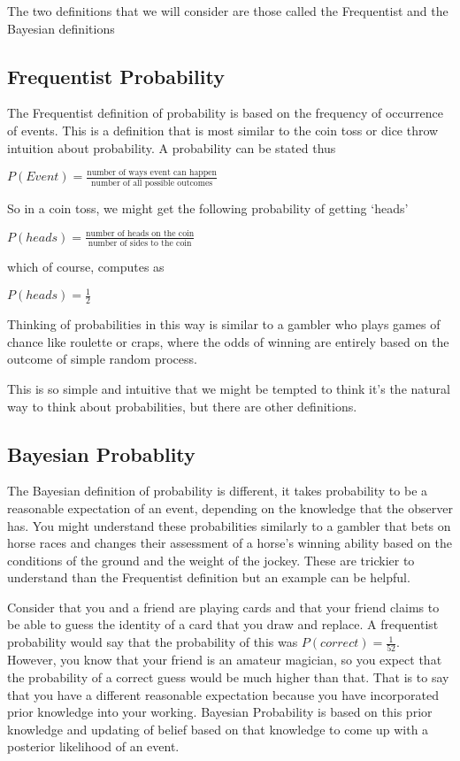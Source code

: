 \documentclass[
]{book}
\begin{document}
The two definitions that we will consider are those called the Frequentist and the Bayesian definitions

\hypertarget{frequentist-probability}{%
\subsection{Frequentist Probability}\label{frequentist-probability}}

The Frequentist definition of probability is based on the frequency of occurrence of events. This is a definition that is most similar to the coin toss or dice throw intuition about probability. A probability can be stated thus

\(P(Event) = \frac{\text{number of ways event can happen}}{\text{number of all possible outcomes}}\)

So in a coin toss, we might get the following probability of getting `heads'

\(P(heads) = \frac{\text{number of heads on the coin}}{\text{number of sides to the coin}}\)

which of course, computes as

\(P(heads) = \frac{1}{2}\)

Thinking of probabilities in this way is similar to a gambler who plays games of chance like roulette or craps, where the odds of winning are entirely based on the outcome of simple random process.

This is so simple and intuitive that we might be tempted to think it's the natural way to think about probabilities, but there are other definitions.

\hypertarget{bayesian-probablity}{%
\subsection{Bayesian Probablity}\label{bayesian-probablity}}

The Bayesian definition of probability is different, it takes probability to be a reasonable expectation of an event, depending on the knowledge that the observer has. You might understand these probabilities similarly to a gambler that bets on horse races and changes their assessment of a horse's winning ability based on the conditions of the ground and the weight of the jockey. These are trickier to understand than the Frequentist definition but an example can be helpful.

Consider that you and a friend are playing cards and that your friend claims to be able to guess the identity of a card that you draw and replace. A frequentist probability would say that the probability of this was \(P(correct) = \frac{1}{52}\). However, you know that your friend is an amateur magician, so you expect that the probability of a correct guess would be much higher than that. That is to say that you have a different reasonable expectation because you have incorporated prior knowledge into your working. Bayesian Probability is based on this prior knowledge and updating of belief based on that knowledge to come up with a posterior likelihood of an event.
\end{document}
